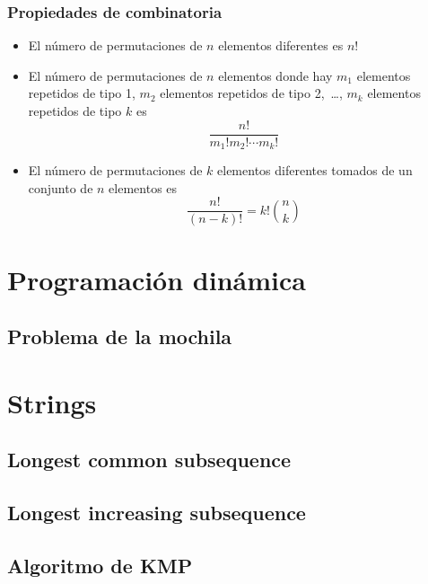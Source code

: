 \documentclass[10pt,letterpaper,twocolumn]{article}
\begin{document}
		\subsubsection{Propiedades de combinatoria}
		\begin{itemize}
			\item El número de permutaciones de $n$ elementos diferentes es $n!$
			\item El número de permutaciones de $n$ elementos donde hay $m_1$ elementos repetidos de tipo 1, $m_2$ elementos repetidos de tipo 2,~\ldots, $m_k$ elementos repetidos de tipo $k$ es $$\frac{n!}{m_1! m_2! \cdots m_k!} $$
			\item El número de permutaciones de $k$ elementos diferentes tomados de un conjunto de $n$ elementos es $$ \frac{n!}{(n-k)!} = k! \binom{n}{k}$$
		\end{itemize}
		
		
	
\section{Programación dinámica}
	\subsection{Problema de la mochila}
	
	
\section{Strings}
	\subsection{Longest common subsequence}
	
	\subsection{Longest increasing subsequence}
	
	\subsection{Algoritmo de KMP}
	
	
\end{document}

